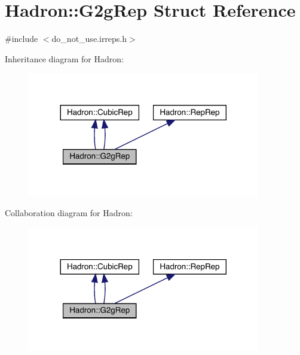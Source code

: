 \hypertarget{structHadron_1_1G2gRep}{}\section{Hadron\+:\+:G2g\+Rep Struct Reference}
\label{structHadron_1_1G2gRep}


{\ttfamily \#include $<$do\+\_\+not\+\_\+use.\+irreps.\+h$>$}



Inheritance diagram for Hadron\+:\nopagebreak
\begin{figure}[H]
\begin{center}
\leavevmode
\includegraphics[width=288pt]{df/d8f/structHadron_1_1G2gRep__inherit__graph}
\end{center}
\end{figure}


Collaboration diagram for Hadron\+:\nopagebreak
\begin{figure}[H]
\begin{center}
\leavevmode
\includegraphics[width=288pt]{d5/dee/structHadron_1_1G2gRep__coll__graph}
\end{center}
\end{figure}

